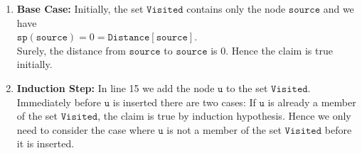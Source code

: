 \begin{enumerate}
\item \textbf{Base Case:}  
      Initially, the set $\mathtt{Visited}$ contains only the node $\mathtt{source}$ and we have
      \\[0.2cm]
      \hspace*{1.3cm}
      $\mathtt{sp}(\mathtt{source}) = 0 = \mathtt{Distance}[\mathtt{source}]$.
      \\[0.2cm]
      Surely, the distance from $\mathtt{source}$ to $\mathtt{source}$ is $0$.  Hence the claim is true initially.
\item \textbf{Induction Step:}
      In line 15 we add the node $\mathtt{u}$ to the set $\mathtt{Visited}$.  Immediately before $\mathtt{u}$ is
      inserted there are two cases: If $\mathtt{u}$ is already a member of the set $\mathtt{Visited}$, the
      claim is true by induction hypothesis.  Hence we only need to consider the case where
     $\mathtt{u}$ is not a member of the set $\mathtt{Visited}$ before it is inserted.


\end{enumerate}
